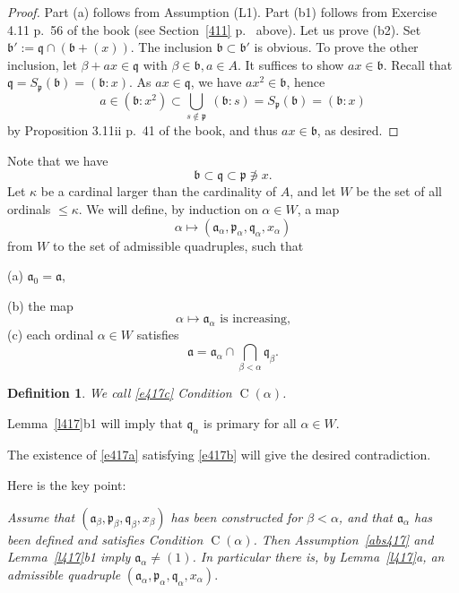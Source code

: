 \documentclass[parskip=half,fontsize=12pt]{scrartcl}%
\newcommand{\oo}{\operatorname}\newcommand{\ooo}{\operatorname*}
\newcommand{\mf}{\mathfrak}
\newcommand{\aaa}{\mf a}
\newcommand{\bbb}{\mf b}
\newcommand{\ppp}{\mf p}
\newcommand{\qqq}{\mf q}
\newtheorem{df}[thm]{Definition}
\begin{document}
\begin{proof}
Part (a) follows from Assumption (L1). Part (b1) follows from Exercise 4.11 p.~56 of the book (see Section~\ref{411} p.~\pageref{411} above). Let us prove (b2). Set $\bbb':=\mathfrak q\cap(\bbb+(x))$. The inclusion $\bbb\subset\bbb'$ is obvious. To prove the other inclusion, let $\beta+ax\in\qqq$ with $\beta\in\bbb,a\in A$. It suffices to show $ax\in\bbb$. Recall that $\qqq=S_{\ppp}(\bbb)=(\bbb:x)$. As $ax\in\qqq$, we have $ax^2\in\bbb$, hence 
$$
a\in(\bbb:x^2)\subset\bigcup_{s\notin\ppp}\ (\bbb:s)=S_{\ppp}(\bbb)=(\bbb:x)
$$ 
by Proposition 3.11ii p.~41 of the book, and thus $ax\in\bbb$, as desired. 
\end{proof}

Note that we have 
$$
\bbb\subset\qqq\subset\ppp\not\ni x.
$$
Let $\kappa$ be a cardinal larger than the cardinality of $A$, and let $W$ be the set of all ordinals $\le\kappa$. We will define, by induction on $\alpha\in W$, a map 
\begin{equation}\label{e417a}
\alpha\mapsto(\aaa_\alpha,\ppp_\alpha,\qqq_\alpha,x_\alpha)
\end{equation}
from $W$ to the set of admissible quadruples, such that 

(a) $\aaa_0=\aaa$, 

(b) the map 
\begin{equation}\label{e417b}
\alpha\mapsto\aaa_\alpha\text{ is increasing,}
\end{equation} 
(c) each ordinal $\alpha\in W$ satisfies 
\begin{equation}\label{e417c}
\aaa=\aaa_\alpha\cap\bigcap_{\beta<\alpha}\qqq_\beta.
\end{equation}
\begin{df}\label{calpha}
We call \eqref{e417c} Condition $\oo C(\alpha)$. 
\end{df}

Lemma~\ref{l417}b1 will imply that $\qqq_\alpha$ is primary for all $\alpha\in W$. 

The existence of \eqref{e417a} satisfying \eqref{e417b} will give the desired contradiction.

Here is the key point:

\emph{Assume that $(\aaa_\beta,\ppp_\beta,\qqq_\beta,x_\beta)$ has been constructed for $\beta<\alpha$, and that $\aaa_\alpha$ has been defined and satisfies Condition $\oo C(\alpha)$. Then Assumption~\eqref{abs417} and Lemma~\ref{l417}b1 imply $\aaa_\alpha\ne(1)$. In particular there is, by Lemma~\ref{l417}a, an admissible quadruple} $(\aaa_\alpha,\ppp_\alpha,\qqq_\alpha,x_\alpha)$.
\end{document}
